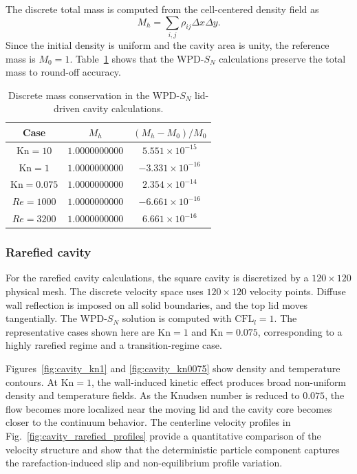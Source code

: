 \documentclass[preprint,12pt]{elsarticle}
\begin{document}
The discrete total mass is computed from the cell-centered density field as
\[
M_h=\sum_{i,j}\rho_{ij}\Delta x\Delta y .
\]
Since the initial density is uniform and the cavity area is unity, the reference mass is \(M_0=1\). Table~\ref{tab:cavity_mass_conservation} shows that the WPD-\(S_N\) calculations preserve the total mass to round-off accuracy.

\begin{table}[!htbp]
\centering
\caption{Discrete mass conservation in the WPD-\(S_N\) lid-driven cavity calculations.}
\label{tab:cavity_mass_conservation}
\begin{tabular}{ccc}
\toprule
Case & \(M_h\) & \((M_h-M_0)/M_0\) \\
\midrule
\(\mathrm{Kn}=10\) & \(1.0000000000\) & \(5.551\times10^{-15}\) \\
\(\mathrm{Kn}=1\) & \(1.0000000000\) & \(-3.331\times10^{-16}\) \\
\(\mathrm{Kn}=0.075\) & \(1.0000000000\) & \(2.354\times10^{-14}\) \\
\(Re=1000\) & \(1.0000000000\) & \(-6.661\times10^{-16}\) \\
\(Re=3200\) & \(1.0000000000\) & \(6.661\times10^{-16}\) \\
\bottomrule
\end{tabular}
\end{table}

\subsubsection{Rarefied cavity}

For the rarefied cavity calculations, the square cavity is discretized by a \(120\times120\) physical mesh. The discrete velocity space uses \(120\times120\) velocity points. Diffuse wall reflection is imposed on all solid boundaries, and the top lid moves tangentially. The WPD-\(S_N\) solution is computed with \(\mathrm{CFL}_l=1\). The representative cases shown here are \(\mathrm{Kn}=1\) and \(\mathrm{Kn}=0.075\), corresponding to a highly rarefied regime and a transition-regime case.

Figures~\ref{fig:cavity_kn1} and \ref{fig:cavity_kn0075} show density and temperature contours. At \(\mathrm{Kn}=1\), the wall-induced kinetic effect produces broad non-uniform density and temperature fields. As the Knudsen number is reduced to \(0.075\), the flow becomes more localized near the moving lid and the cavity core becomes closer to the continuum behavior. The centerline velocity profiles in Fig.~\ref{fig:cavity_rarefied_profiles} provide a quantitative comparison of the velocity structure and show that the deterministic particle component captures the rarefaction-induced slip and non-equilibrium profile variation.
\end{document}
